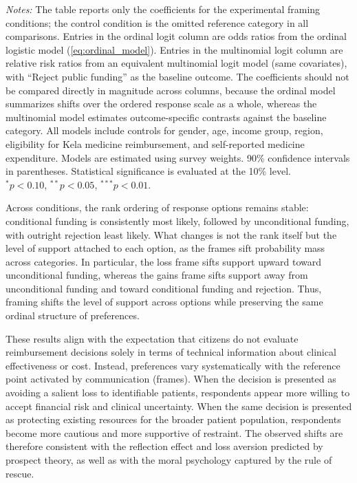 \documentclass[11pt]{article}\usepackage[]{graphicx}\usepackage[]{xcolor}
\begin{document}
\begin{table}[!htbp]
\centering
\caption{Framing Effects on Public Support for Funding Expensive Cancer Medicines}
\label{tab:ologit-models}

\scalebox{0.75}{%
\begin{minipage}{\linewidth}
\centering

\end{minipage}%
}

\par\vspace{0.4ex}
\footnotesize \emph{Notes:} The table reports only the coefficients for the experimental framing conditions; the control condition is the omitted reference category in all comparisons. Entries in the ordinal logit column are odds ratios from the ordinal logistic model (\autoref{eq:ordinal_model}). Entries in the multinomial logit column are relative risk ratios from an equivalent multinomial logit model (same covariates), with ``Reject public funding'' as the baseline outcome. The coefficients should not be compared directly in magnitude across columns, because the ordinal model summarizes shifts over the ordered response scale as a whole, whereas the multinomial model estimates outcome-specific contrasts against the baseline category. All models include controls for gender, age, income group, region, eligibility for Kela medicine reimbursement, and self-reported medicine expenditure. Models are estimated using survey weights. 90\% confidence intervals in parentheses. Statistical significance is evaluated at the 10\% level.\\$^{*}p<0.10$, $^{**}p<0.05$, $^{***}p<0.01$.
\end{table}

Across conditions, the rank ordering of response options remains stable: conditional funding is consistently most likely, followed by unconditional funding, with outright rejection least likely. What changes is not the rank itself but the level of support attached to each option, as the frames sift probability mass across categories. In particular, the loss frame sifts support upward toward unconditional funding, whereas the gains frame sifts support away from unconditional funding and toward conditional funding and rejection. Thus, framing shifts the level of support across options while preserving the same ordinal structure of preferences.

These results align with the expectation that citizens do not evaluate reimbursement decisions solely in terms of technical information about clinical effectiveness or cost. Instead, preferences vary systematically with the reference point activated by communication (frames). When the decision is presented as avoiding a salient loss to identifiable patients, respondents appear more willing to accept financial risk and clinical uncertainty. When the same decision is presented as protecting existing resources for the broader patient population, respondents become more cautious and more supportive of restraint. The observed shifts are therefore consistent with the reflection effect and loss aversion predicted by prospect theory, as well as with the moral psychology captured by the rule of rescue.
\end{document}

